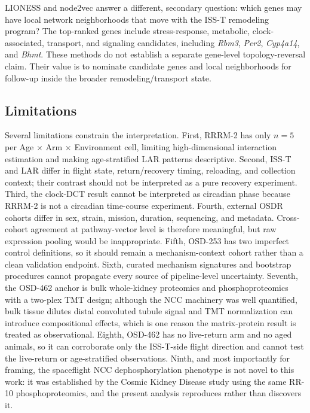 \documentclass[11pt]{article}
\newcommand{\gene}[1]{\textit{#1}}
\begin{document}
LIONESS and node2vec answer a different, secondary question: which genes may have local network neighborhoods that move with the ISS-T remodeling program? The top-ranked genes include stress-response, metabolic, clock-associated, transport, and signaling candidates, including \gene{Rbm3}, \gene{Per2}, \gene{Cyp4a14}, and \gene{Bhmt}. These methods do not establish a separate gene-level topology-reversal claim. Their value is to nominate candidate genes and local neighborhoods for follow-up inside the broader remodeling/transport state.

\subsection{Limitations}

Several limitations constrain the interpretation. First, RRRM-2 has only $n=5$ per Age $\times$ Arm $\times$ Environment cell, limiting high-dimensional interaction estimation and making age-stratified LAR patterns descriptive. Second, ISS-T and LAR differ in flight state, return/recovery timing, reloading, and collection context; their contrast should not be interpreted as a pure recovery experiment. Third, the clock-DCT result cannot be interpreted as circadian phase because RRRM-2 is not a circadian time-course experiment. Fourth, external OSDR cohorts differ in sex, strain, mission, duration, sequencing, and metadata. Cross-cohort agreement at pathway-vector level is therefore meaningful, but raw expression pooling would be inappropriate. Fifth, OSD-253 has two imperfect control definitions, so it should remain a mechanism-context cohort rather than a clean validation endpoint. Sixth, curated mechanism signatures and bootstrap procedures cannot propagate every source of pipeline-level uncertainty. Seventh, the OSD-462 anchor is bulk whole-kidney proteomics and phosphoproteomics with a two-plex TMT design; although the NCC machinery was well quantified, bulk tissue dilutes distal convoluted tubule signal and TMT normalization can introduce compositional effects, which is one reason the matrix-protein result is treated as observational. Eighth, OSD-462 has no live-return arm and no aged animals, so it can corroborate only the ISS-T-side flight direction and cannot test the live-return or age-stratified observations. Ninth, and most importantly for framing, the spaceflight NCC dephosphorylation phenotype is not novel to this work: it was established by the Cosmic Kidney Disease study using the same RR-10 phosphoproteomics, and the present analysis reproduces rather than discovers it.
\end{document}
